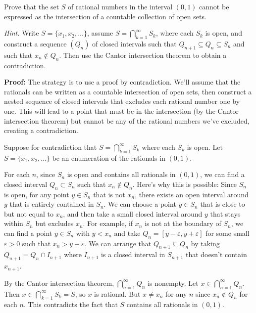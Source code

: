 \begin{problembox}
Prove that the set \( S \) of rational numbers in the interval \( (0, 1) \) cannot be expressed as the intersection of a countable collection of open sets. 

\textit{Hint.} Write \( S = \{x_1, x_2, \ldots\} \), assume \( S = \bigcap_{k=1}^{\infty} S_k \), where each \( S_k \) is open, and construct a sequence \( (Q_n) \) of closed intervals such that \( Q_{n+1} \subseteq Q_n \subseteq S_n \) and such that \( x_n \notin Q_n \). Then use the Cantor intersection theorem to obtain a contradiction.
\end{problembox}

\textbf{Proof:} The strategy is to use a proof by contradiction. We'll assume that the rationals can be written as a countable intersection of open sets, then construct a nested sequence of closed intervals that excludes each rational number one by one. This will lead to a point that must be in the intersection (by the Cantor intersection theorem) but cannot be any of the rational numbers we've excluded, creating a contradiction.

Suppose for contradiction that $S = \bigcap_{k=1}^{\infty} S_k$ where each $S_k$ is open. Let $S = \{x_1, x_2, \ldots\}$ be an enumeration of the rationals in $(0,1)$.

For each $n$, since $S_n$ is open and contains all rationals in $(0,1)$, we can find a closed interval $Q_n \subset S_n$ such that $x_n \notin Q_n$. Here's why this is possible: Since $S_n$ is open, for any point $y \in S_n$ that is not $x_n$, there exists an open interval around $y$ that is entirely contained in $S_n$. We can choose a point $y \in S_n$ that is close to but not equal to $x_n$, and then take a small closed interval around $y$ that stays within $S_n$ but excludes $x_n$. For example, if $x_n$ is not at the boundary of $S_n$, we can find a point $y \in S_n$ with $y < x_n$ and take $Q_n = [y - \varepsilon, y + \varepsilon]$ for some small $\varepsilon > 0$ such that $x_n > y + \varepsilon$. We can arrange that $Q_{n+1} \subseteq Q_n$ by taking $Q_{n+1} = Q_n \cap I_{n+1}$ where $I_{n+1}$ is a closed interval in $S_{n+1}$ that doesn't contain $x_{n+1}$.

By the Cantor intersection theorem, $\bigcap_{n=1}^{\infty} Q_n$ is nonempty. Let $x \in \bigcap_{n=1}^{\infty} Q_n$. Then $x \in \bigcap_{k=1}^{\infty} S_k = S$, so $x$ is rational. But $x \neq x_n$ for any $n$ since $x_n \notin Q_n$ for each $n$. This contradicts the fact that $S$ contains all rationals in $(0,1)$.

